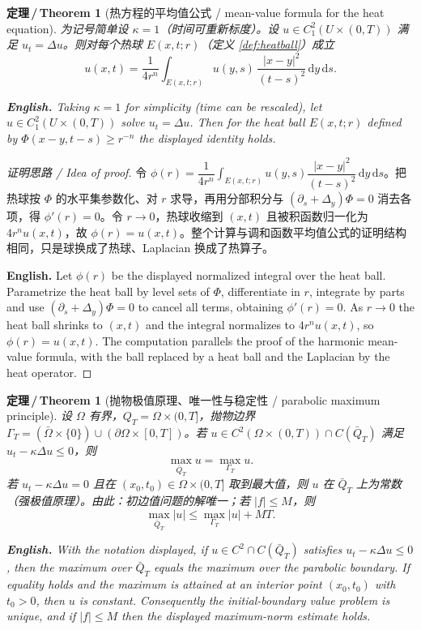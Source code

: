 \documentclass[UTF8,11pt,a4paper]{ctexart}
\newcommand{\EN}[1]{\par\noindent \textbf{English.} #1\par}
\newtheorem{theorem}[definition]{定理\,/\,Theorem}
\newcommand{\dd}{\mathrm{d}}
\begin{document}
\begin{theorem}[热方程的平均值公式 / mean-value formula for the heat equation]\label{thm:heatmvp}
为记号简单设 $\kappa=1$（时间可重新标度）。设 $u\in C^2_1(U\times(0,T))$ 满足 $u_t=\Delta u$。则对每个热球 $E(x,t;r)$（定义 \ref{def:heatball}）成立
\[
u(x,t)=\frac{1}{4r^n}\int_{E(x,t;r)}u(y,s)\,\frac{|x-y|^2}{(t-s)^2}\,\dd y\,\dd s .
\]
\EN{Taking $\kappa=1$ for simplicity (time can be rescaled), let $u\in C^2_1(U\times(0,T))$ solve $u_t=\Delta u$. Then for the heat ball $E(x,t;r)$ defined by $\Phi(x-y,t-s)\ge r^{-n}$ the displayed identity holds.}
\end{theorem}

\begin{proof}[证明思路 / Idea of proof]
令 $\phi(r)=\dfrac{1}{4r^n}\displaystyle\int_{E(x,t;r)}u(y,s)\dfrac{|x-y|^2}{(t-s)^2}\,\dd y\,\dd s$。把热球按 $\Phi$ 的水平集参数化、对 $r$ 求导，再用分部积分与 $(\partial_s+\Delta_y)\Phi=0$ 消去各项，得 $\phi'(r)=0$。令 $r\to0$，热球收缩到 $(x,t)$ 且被积函数归一化为 $4r^nu(x,t)$，故 $\phi(r)=u(x,t)$。整个计算与调和函数平均值公式的证明结构相同，只是球换成了热球、Laplacian 换成了热算子。\EN{Let $\phi(r)$ be the displayed normalized integral over the heat ball. Parametrize the heat ball by level sets of $\Phi$, differentiate in $r$, integrate by parts and use $(\partial_s+\Delta_y)\Phi=0$ to cancel all terms, obtaining $\phi'(r)=0$. As $r\to0$ the heat ball shrinks to $(x,t)$ and the integral normalizes to $4r^nu(x,t)$, so $\phi(r)=u(x,t)$. The computation parallels the proof of the harmonic mean-value formula, with the ball replaced by a heat ball and the Laplacian by the heat operator.}
\end{proof}

\begin{theorem}[抛物极值原理、唯一性与稳定性 / parabolic maximum principle]\label{thm:heatmax}
设 $\Omega$ 有界，$Q_T=\Omega\times(0,T]$，抛物边界 $\Gamma_T=(\bar\Omega\times\{0\})\cup(\partial\Omega\times[0,T])$。若 $u\in C^2(\Omega\times(0,T))\cap C(\bar Q_T)$ 满足 $u_t-\kappa\Delta u\le0$，则
\[
\max_{\bar Q_T}u=\max_{\Gamma_T}u .
\]
若 $u_t-\kappa\Delta u=0$ 且在 $(x_0,t_0)\in\Omega\times(0,T]$ 取到最大值，则 $u$ 在 $\bar Q_T$ 上为常数（强极值原理）。由此：初边值问题的解唯一；若 $|f|\le M$，则
\[
\max_{\bar Q_T}|u|\le\max_{\Gamma_T}|u|+MT .
\]
\EN{With the notation displayed, if $u\in C^2\cap C(\bar Q_T)$ satisfies $u_t-\kappa\Delta u\le0$, then the maximum over $\bar Q_T$ equals the maximum over the parabolic boundary. If equality holds and the maximum is attained at an interior point $(x_0,t_0)$ with $t_0>0$, then $u$ is constant. Consequently the initial-boundary value problem is unique, and if $|f|\le M$ then the displayed maximum-norm estimate holds.}
\end{theorem}
\end{document}
